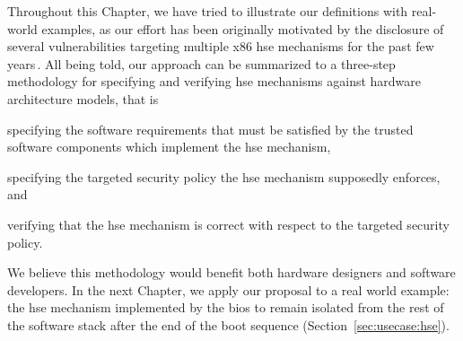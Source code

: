 Throughout this Chapter, we have tried to illustrate our definitions with
real-world examples, as our effort has been originally motivated by the
disclosure of several vulnerabilities targeting multiple x86 \ac{hse} mechanisms
for the past few
years\,\cite{wojtczuk2009smram,duflot2009smram,rutkowska2008remap,domas2015sinkhole,kallenberg2015racecondition}.
%
All being told, our approach can be summarized to a three-step methodology for
specifying and verifying \ac{hse} mechanisms against hardware architecture
models, that is
%
\begin{inparaenum}[(1)]
\item specifying the software requirements that must be satisfied by the trusted
  software components which implement the \ac{hse} mechanism,
%
\item specifying the targeted security policy the \ac{hse} mechanism supposedly
  enforces, and
%
\item verifying that the \ac{hse} mechanism is correct with respect to the
  targeted security policy.
\end{inparaenum}
%
We believe this methodology would benefit both hardware designers and software
developers.
%
In the next Chapter, we apply our proposal to a real world example: the \ac{hse}
mechanism implemented by the \ac{bios} to remain isolated from the rest of the
software stack after the end of the boot sequence
(Section~\ref{sec:usecase:hse}).
